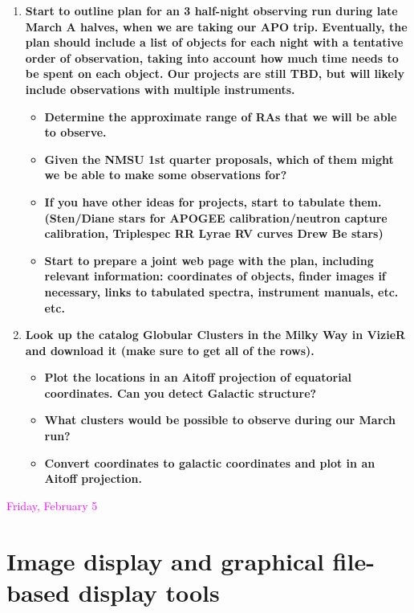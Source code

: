\documentclass[12pt]{article}
\begin{document}
\begin{enumerate}[1.]
    \item \textbf{Start to outline plan for an 3 half-night observing
    run during late March A halves, when we are taking our APO trip.
    Eventually, the plan should include a list of objects for each
    night with a tentative order of observation, taking into account
    how much time needs to be spent on each object. Our projects are
    still TBD, but will likely include observations with multiple
    instruments.}
        \begin{itemize}
            \item \textbf{Determine the approximate range of RAs that
            we will be able to observe. }
            \item \textbf{Given the NMSU 1st quarter proposals, which
            of them might we be able to make some observations for?}
            \item \textbf{If you have other ideas for projects, start
            to tabulate them. (Sten/Diane stars for APOGEE
            calibration/neutron capture calibration, Triplespec RR
            Lyrae RV curves Drew Be stars)}
            \item \textbf{Start to prepare a joint web page with the
            plan, including relevant information: coordinates of
            objects, finder images if necessary, links to tabulated
            spectra, instrument manuals, etc. etc. }
        \end{itemize}

    \item \textbf{Look up the catalog Globular Clusters in the Milky
    Way in VizieR and download it (make sure to get all of the rows).}
        \begin{itemize}
            \item \textbf{Plot the locations in an Aitoff projection
            of equatorial coordinates. Can you detect Galactic
            structure?}
            \item \textbf{What clusters would be possible to observe
            during our March run? }
            \item \textbf{Convert coordinates to galactic coordinates
            and plot in an Aitoff projection.}
        \end{itemize}

\end{enumerate}

\newpage
\textcolor{magenta}{Friday, February 5}

\section*{Image display and graphical file-based display tools}
\end{document}
